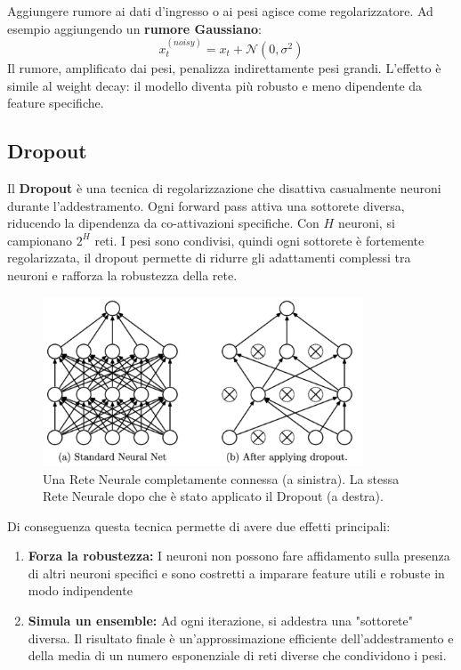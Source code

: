 Aggiungere rumore ai dati d’ingresso o ai pesi agisce come regolarizzatore. Ad esempio aggiungendo un \textbf{rumore Gaussiano}:
\[
x_t^{(noisy)} = x_t + \mathcal{N}(0, \sigma^2)
\]
Il rumore, amplificato dai pesi, penalizza indirettamente pesi grandi. L’effetto è simile al weight decay: il modello diventa più robusto e meno dipendente da feature specifiche.

\subsection{Dropout}

Il \textbf{Dropout} è una tecnica di regolarizzazione che disattiva casualmente neuroni durante l’addestramento. Ogni forward pass attiva una sottorete diversa, riducendo la dipendenza da co-attivazioni specifiche. Con \( H \) neuroni, si campionano \( 2^H \) reti. I pesi sono condivisi, quindi ogni sottorete è fortemente regolarizzata, il dropout permette di ridurre gli adattamenti complessi tra neuroni e rafforza la robustezza della rete.
\begin{figure}
    \centering
    \includegraphics[width=0.85\textwidth]{figure/Dropout.png}
    \caption{Una Rete Neurale completamente connessa (a sinistra). La stessa Rete Neurale dopo che è stato applicato il Dropout (a destra).}
    \label{fig:dropout}
\end{figure}
Di conseguenza questa tecnica permette di avere due effetti principali:
\begin{enumerate}
    \item \textbf{Forza la robustezza:} I neuroni non possono fare affidamento sulla presenza di altri neuroni specifici e sono costretti a imparare feature utili e robuste in modo indipendente
    \item \textbf{Simula un ensemble:} Ad ogni iterazione, si addestra una "sottorete" diversa. Il risultato finale è un'approssimazione efficiente dell'addestramento e della media di un numero esponenziale di reti diverse che condividono i pesi.
\end{enumerate}

